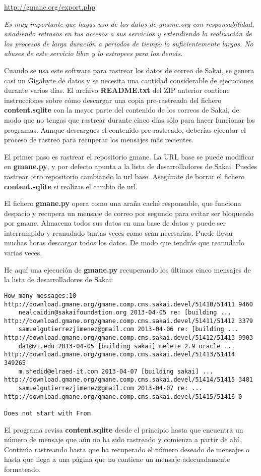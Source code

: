 \url{http://gmane.org/export.php}

{\em Es muy importante que hagas uso de los datos de gname.org con
responsabilidad, añadiendo retrasos en tus accesos a sus servicios y extendiendo
la realización de los procesos de larga duración a periodos de tiempo lo suficientemente largos.
No abuses de este servicio libre y lo estropees para los demás.}

Cuando se usa este software para rastrear los datos de correo de Sakai, se genera casi
un Gigabyte de datos y se necesita una cantidad considerable de ejecuciones durante varios días.
El archivo {\bf README.txt} del ZIP anterior contiene instrucciones sobre cómo
descargar una copia pre-rastreada del fichero {\bf content.sqlite} con
la mayor parte del contenido de los correos de Sakai, de modo que no tengas que rastrear
durante cinco días sólo para hacer funcionar los programas. Aunque descargues el contenido
pre-rastreado, deberías ejecutar el proceso de rastreo para recuperar los
mensajes más recientes.

El primer paso es rastrear el repositorio gmane. La URL base
se puede modificar en {\bf gmane.py}, y por defecto apunta a la lista
de desarrolladores de Sakai. Puedes rastrear otro repositorio cambiando la
url base. Asegúrate de borrar el fichero {\bf content.sqlite} si realizas
el cambio de url.

El fichero {\bf gmane.py} opera como una araña caché responsable, que
funciona despacio y recupera un mensaje de correo por segundo para
evitar ser bloqueado por gmane. Almacena todos sus datos
en una base de datos y puede ser interrumpido y reanudado tantas veces como
sean necesarias. Puede llevar muchas horas descargar todos los datos.
De modo que tendrás que reanudarlo varias veces.

He aquí una ejecución de {\bf gmane.py} recuperando los últimos cinco mensajes de
la lista de desarrolladores de Sakai:

\beforeverb
\begin{verbatim}
How many messages:10
http://download.gmane.org/gmane.comp.cms.sakai.devel/51410/51411 9460
    nealcaidin@sakaifoundation.org 2013-04-05 re: [building ...
http://download.gmane.org/gmane.comp.cms.sakai.devel/51411/51412 3379
    samuelgutierrezjimenez@gmail.com 2013-04-06 re: [building ...
http://download.gmane.org/gmane.comp.cms.sakai.devel/51412/51413 9903
    da1@vt.edu 2013-04-05 [building sakai] melete 2.9 oracle ...
http://download.gmane.org/gmane.comp.cms.sakai.devel/51413/51414 349265
    m.shedid@elraed-it.com 2013-04-07 [building sakai] ...
http://download.gmane.org/gmane.comp.cms.sakai.devel/51414/51415 3481
    samuelgutierrezjimenez@gmail.com 2013-04-07 re: ...
http://download.gmane.org/gmane.comp.cms.sakai.devel/51415/51416 0

Does not start with From 
\end{verbatim}
\afterverb
%
El programa revisa {\bf content.sqlite} desde el principio hasta que encuentra un número de mensaje que
aún no ha sido rastreado y comienza a partir de ahí. Continúa rastreando
hasta que ha recuperado el número deseado de mensajes o hasta que llega a una página
que no contiene un mensaje adecuadamente formateado.

